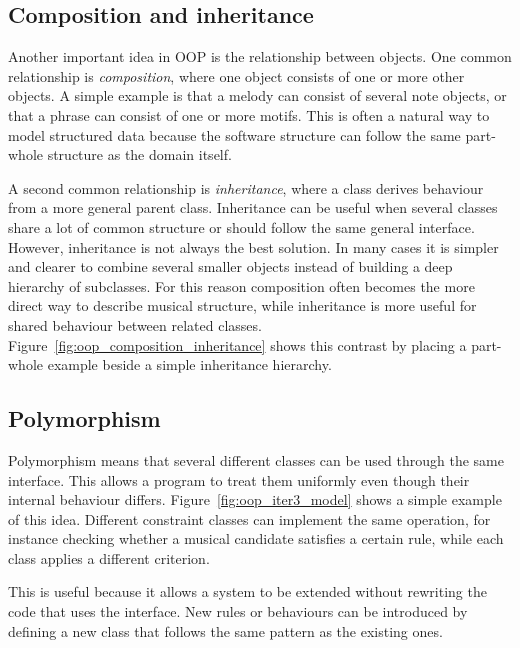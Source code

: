   

\subsection{Composition and inheritance}

  Another important idea in \ac{OOP} is the relationship between objects. One common relationship is \textit{composition}, where one object consists of one or more other objects. A simple example is that a melody can consist of several note objects, or that a phrase can consist of one or more motifs. This is often a natural way to model structured data because the software structure can follow the same part-whole structure as the domain itself.

  A second common relationship is \textit{inheritance}, where a class derives behaviour from a more general parent class. Inheritance can be useful when several classes share a lot of common structure or should follow the same general interface. However, inheritance is not always the best solution. In many cases it is simpler and clearer to combine several smaller objects instead of building a deep hierarchy of subclasses. For this reason composition often becomes the more direct way to describe musical structure, while inheritance is more useful for shared behaviour between related classes. Figure~\ref{fig:oop_composition_inheritance} shows this contrast by placing a part-whole example beside a simple inheritance hierarchy.

  

\subsection{Polymorphism}

  Polymorphism means that several different classes can be used through the same interface. This allows a program to treat them uniformly even though their internal behaviour differs. Figure~\ref{fig:oop_iter3_model} shows a simple example of this idea. Different constraint classes can implement the same operation, for instance checking whether a musical candidate satisfies a certain rule, while each class applies a different criterion.

  

  This is useful because it allows a system to be extended without rewriting the code that uses the interface. New rules or behaviours can be introduced by defining a new class that follows the same pattern as the existing ones.

